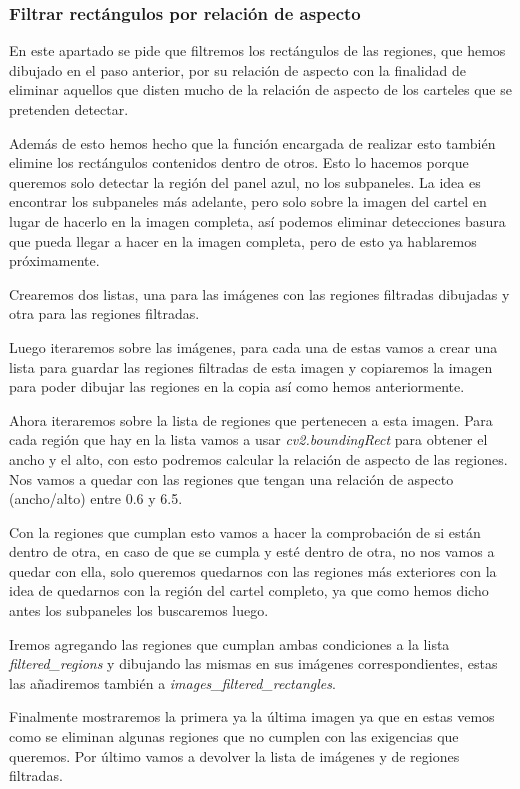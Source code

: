 \documentclass[a4paper, 12pt]{article}
\begin{document}
\subsubsection{Filtrar rectángulos por relación de aspecto}
En este apartado se pide que filtremos los rectángulos de las regiones, que hemos dibujado en el paso anterior, por su relación de aspecto con la finalidad de eliminar aquellos que disten mucho de la relación de aspecto de los carteles que se pretenden detectar. 


Además de esto hemos hecho que la función encargada de realizar esto también elimine los rectángulos contenidos dentro de otros. Esto lo hacemos porque queremos solo detectar la región del panel azul, no los subpaneles. La idea es encontrar los subpaneles más adelante, pero solo sobre la imagen del cartel en lugar de hacerlo en la imagen completa, así podemos eliminar detecciones basura que pueda llegar a hacer en la imagen completa, pero de esto ya hablaremos próximamente.


Crearemos dos listas, una para las imágenes con las regiones filtradas dibujadas y otra para las regiones filtradas. 


Luego iteraremos sobre las imágenes, para cada una de estas vamos a crear una lista para guardar las regiones filtradas de esta imagen y copiaremos la imagen para poder dibujar las regiones en la copia así como hemos anteriormente. 


Ahora iteraremos sobre la lista de regiones que pertenecen a esta imagen. Para cada región que hay en la lista vamos a usar \textit{cv2.boundingRect} para obtener el ancho y el alto, con esto podremos calcular la relación de aspecto de las regiones. Nos vamos a quedar con las regiones que tengan una relación de aspecto (ancho/alto) entre 0.6 y 6.5. 


Con la regiones que cumplan esto vamos a hacer la comprobación de si están dentro de otra, en caso de que se cumpla y esté dentro de otra, no nos vamos a quedar con ella, solo queremos quedarnos con las regiones más exteriores con la idea de quedarnos con la región del cartel completo, ya que como hemos dicho antes los subpaneles los buscaremos luego.

Iremos agregando las regiones que cumplan ambas condiciones a la lista \textit{filtered\_regions} y dibujando las mismas en sus imágenes correspondientes, estas las añadiremos también a \textit{images\_filtered\_rectangles}.

Finalmente mostraremos la primera ya la última imagen ya que en estas vemos como se eliminan algunas regiones que no cumplen con las exigencias que queremos. Por último vamos a devolver la lista de imágenes y de regiones filtradas.
\end{document}
